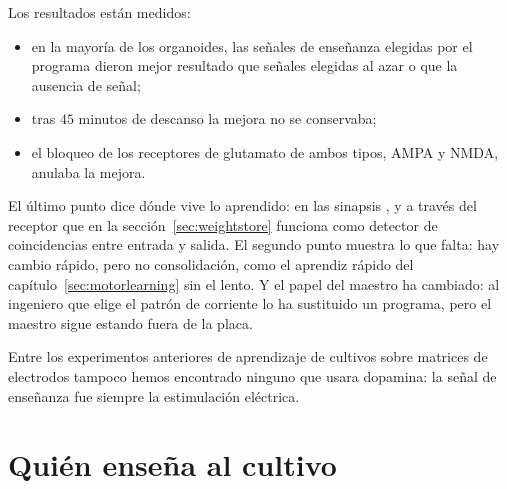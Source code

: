 Los resultados están medidos:
\begin{itemize}
\item en la mayoría de los organoides, las señales de enseñanza elegidas por el programa dieron mejor resultado que señales elegidas al azar o que la ausencia de señal;
\item tras $45$ minutos de descanso la mejora no se conservaba;
\item el bloqueo de los receptores de glutamato de ambos tipos, AMPA y NMDA, anulaba la mejora.
\end{itemize}

El último punto dice dónde vive lo aprendido: en las sinapsis , y a través del receptor que en la sección~\ref{sec:weightstore} funciona como detector de coincidencias entre entrada y salida. El segundo punto muestra lo que falta: hay cambio rápido, pero no consolidación, como el aprendiz rápido del capítulo~\ref{sec:motorlearning} sin el lento. Y el papel del maestro ha cambiado: al ingeniero que elige el patrón de corriente lo ha sustituido un programa, pero el maestro sigue estando fuera de la placa.

Entre los experimentos anteriores de aprendizaje de cultivos sobre matrices de electrodos tampoco hemos encontrado ninguno que usara dopamina: la señal de enseñanza fue siempre la estimulación eléctrica.

\section{Quién enseña al cultivo}

